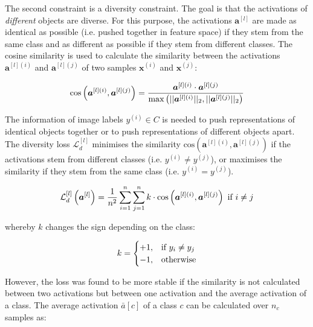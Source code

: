 The second constraint is a diversity constraint. The goal is that the activations of \emph{different} objects are diverse. For this purpose, the activations $\boldsymbol{a}^{[l]}$ are made as identical as possible (i.e. pushed together in feature space) if they stem from the same class and as different as possible if they stem from different classes.
The cosine similarity is used to calculate the similarity between the activations $\boldsymbol{a}^{[l](i)}$ and $\boldsymbol{a}^{[l](j)}$ of two samples $\boldsymbol{x}^{(i)}$ and $\boldsymbol{x}^{(j)}$:

\begin{equation}\eqlbl{vso_5}
		\text{cos}\left( \boldsymbol{a}^{[l](i)}, \boldsymbol{a}^{[l](j)} \right) = \frac{\boldsymbol{a}^{[l](i)} \cdot \boldsymbol{a}^{[l](j)}}{\max \left( ||\boldsymbol{a}^{[l](i)}||_2, ||\boldsymbol{a}^{[l](j)}||_2 \right)}
\end{equation}

The information of image labels $y^{(i)} \in C$ is needed to push representations of identical objects together or to push representations of different objects apart.
The diversity loss $\mathcal{L}^{[l]}_d$ minimises the similarity $\text{cos} \left(\boldsymbol{a}^{[l](i)}, \boldsymbol{a}^{[l](j)} \right)$ if the activations stem from different classes (i.e. $y^{(i)} \neq y^{(j)}$), or maximises the similarity if they stem from the same class (i.e. $y^{(i)} = y^{(j)}$).

\begin{equation}\eqlbl{vso_6}
		\mathcal{L}^{[l]}_{d} \left(\boldsymbol{a}^{[l]} \right) = \frac{1}{n^2} \sum_{i=1}^{n} \sum_{j=1}^{n} k \cdot \text{cos} \left( \boldsymbol{a}^{[l](i)}, \boldsymbol{a}^{[l](j)} \right) \text{ if } i \neq j
\end{equation}

whereby $k$ changes the sign depending on the class:

\begin{equation}\eqlbl{vso_7}
		k = \begin{cases}
      		+1, & \text{if}\ y_i \neq y_j \\
      		-1, & \text{otherwise}
    	\end{cases}
\end{equation}

However, the loss was found to be more stable if the similarity is not calculated between two activations but between one activation and the average activation of a class. The average activation $\bar{a}[c]$ of a class $c$ can be calculated over $n_c$ samples as:

